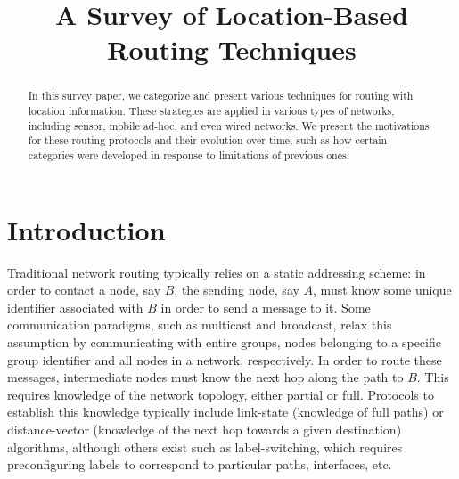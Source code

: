 \documentclass[conference]{IEEEtran}
\begin{document}
%
\title{A Survey of Location-Based Routing Techniques}

\author{
}



\maketitle



\begin{abstract}
In this survey paper, we categorize and present various techniques for routing with location information.
These strategies are applied in various types of networks, including sensor, mobile ad-hoc, and even wired networks.
We present the motivations for these routing protocols and their evolution over time, such as how certain categories were developed in response to limitations of previous ones.
\end{abstract}

%
\IEEEpeerreviewmaketitle



\section{Introduction}

Traditional network routing typically relies on a static addressing scheme: in order to contact a node, say $B$, the sending node, say $A$, must know some unique identifier associated with $B$ in order to send a message to it.
Some communication paradigms, such as multicast and broadcast, relax this assumption by communicating with entire groups, nodes belonging to a specific group identifier and all nodes in a network, respectively.
In order to route these messages, intermediate nodes must know the next hop along the path to $B$.
This requires knowledge of the network topology, either partial or full.
Protocols to establish this knowledge typically include link-state (knowledge of full paths) or distance-vector (knowledge of the next hop towards a given destination) algorithms, although others exist such as label-switching, which requires preconfiguring labels to correspond to particular paths, interfaces, etc.
\end{document}
